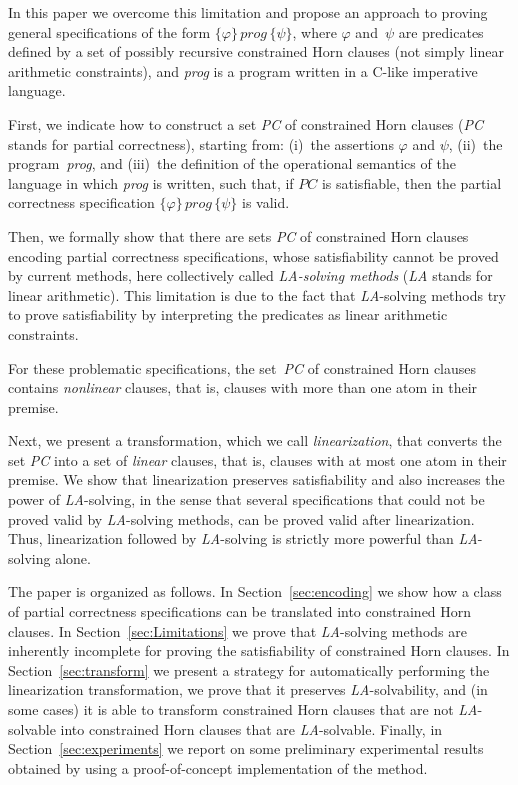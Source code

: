 \documentclass[english]{tlp}
\begin{document}
In this paper we overcome this limitation and propose an approach 
to proving general specifications of the form 
$\{\varphi\}\, \textit{prog}\, \{\psi\}$, where $\varphi$ 
and~$\psi$ are predicates defined by a set of possibly recursive constrained Horn clauses 
(not simply linear arithmetic constraints), 
and {\it prog} is a program written in a C-like imperative language.

First, we indicate how to construct 
a set \textit{PC}  of constrained Horn clauses (\textit{PC} stands for 
partial correctness), 
starting from: (i)~the assertions $\varphi $ and $\psi$, 
(ii)~the program~\textit{prog}, and (iii)~the 
definition of the operational semantics of the language in which
 \textit{prog} is written, 
such that, if $\textit{PC}$ is satisfiable, then the partial correctness 
specification $\{\varphi\}\, \textit{prog}\, \{\psi\}$ is valid.

Then, we formally show that there are sets \textit{PC} of constrained Horn clauses
encoding partial correctness specifications, whose satisfiability cannot  be
proved by current methods,
here collectively called {\it \mbox{{\textit {LA}}-solving} methods}
({\it LA} stands for linear arithmetic).
This limitation is due to the fact that 
\mbox{{\textit {LA}}-solving} methods try to prove satisfiability
by interpreting the predicates as linear arithmetic constraints.

For these problematic specifications, the set~\textit{PC} of constrained Horn clauses contains
{\it nonlinear} clauses, that is, clauses with more than one atom in their premise.

Next, we present a transformation, which we 
call {\it linearization}, that 
converts the set \textit{PC} into
a set of {\it linear} clauses, that is, clauses with at most one 
atom in their premise.
We show that linearization preserves satisfiability and also 
increases the power of {\textit {LA}}-solving, in the sense that
several specifications that could not be proved valid by {\textit {LA}}-solving methods,
can be proved valid after linearization.
Thus, linearization followed by {\textit {LA}}-solving is 
strictly more powerful than {\textit {LA}}-solving alone.

The paper is organized as follows. In Section~\ref{sec:encoding}
we show how a class of partial correctness specifications can be translated into
constrained Horn clauses.
In Section~\ref{sec:Limitations} we prove that {\textit {LA}}-solving methods
are inherently incomplete for proving the satisfiability of constrained Horn clauses.
In Section~\ref{sec:transform} we present a strategy for automatically performing 
the linearization transformation,
we prove that it preserves {\textit {LA}}-solvability, and (in some cases) it is able to
transform constrained Horn clauses that are not {\textit {LA}}-solvable into
constrained Horn clauses that are {\textit {LA}}-solvable. 
Finally, in Section~\ref{sec:experiments}
we report on some preliminary experimental results obtained by using
a proof-of-concept implementation of the method.
\end{document}
